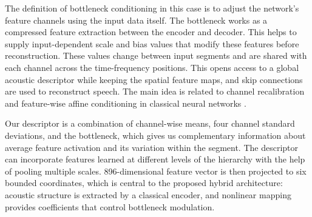 \documentclass[10pt,a4paper]{article}
\begin{document}
The definition of bottleneck conditioning in this case is to adjust the network's feature channels using the input data itself. The bottleneck works as a compressed feature extraction between the encoder and decoder. This helps to supply input-dependent scale and bias values that modify these features before reconstruction. These values change between input segments and are shared with each channel across the time-frequency positions. This opens access to a global acoustic descriptor while keeping the spatial feature maps, and skip connections are used to reconstruct speech. The main idea is related to channel recalibration and feature-wise affine conditioning in classical neural networks \cite{film, senet}.


Our descriptor is a combination of channel-wise means, four channel standard deviations, and the bottleneck, which gives us complementary information about average feature activation and its variation within the segment. The descriptor can incorporate features learned at different levels of the hierarchy with the help of pooling multiple scales. 896-dimensional feature vector is then projected to six bounded coordinates, which is central to the proposed hybrid architecture: acoustic structure is extracted by a classical encoder, and nonlinear mapping provides coefficients that control bottleneck modulation.

\end{document}
